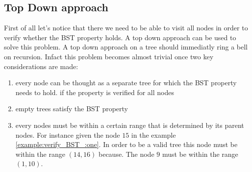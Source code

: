 \subsection{Top Down approach}
\label{verify_BST:sec:topdown}
First of all let's notice that there we need to be able to visit all nodes in order to verify whether the BST property holds. A top down approach can be used to solve this problem. A top down approach on a tree should immediatly ring a bell on recursion. Infact this problem becomes almost trivial once two key considerations are made:
\begin{enumerate}
	\item every node can be thought as a separate tree for which the BST property needs to hold. if the property is verified for all nodes
	\item empty trees satisfy the BST property
	\item every nodes must be within a certain range that is determined by its parent nodes. For instance given the node $15$ in the example \ref{example:verify_BST_:one}. In order to be a valid tree this node must be within the range $(14,16)$ because.  The node $9$ must be within the range $(1,10)$.
\end{enumerate}





